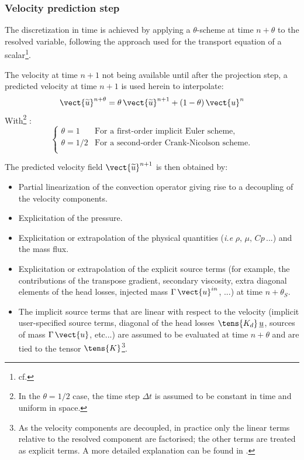 \subsubsection*{Velocity prediction step}
The discretization in time is achieved by applying a $\theta$-scheme
at time $n+\theta$ to the resolved variable, following the approach used
for the transport equation of a scalar\footnote{cf. }.

The velocity at time $n+1$ not being available until after the projection
step, a predicted velocity at time $n+1$ is used herein to interpolate:
\begin{equation}
\label{eq:navstv:theta_scheme}
\vect{\widetilde{u}}^{n+\theta} = \theta\, {\vect{\widetilde{u}}}^{n+1}+(1-\theta)\, \vect{u}^{n}
\end{equation}
With\footnote{In the $\theta = 1/2$ case, the time step $\Delta t$ is assumed
to be constant in time and uniform in space.} :
\begin{equation}
\left\{
\begin{array}{ll}
\theta = 1   & \text{For a first-order implicit Euler scheme,}\\
\theta = 1/2 & \text{For a second-order Crank-Nicolson scheme.}\\
\end{array}
\right.
\end{equation}

The predicted velocity field ${\vect{\widetilde{u}}^{n+1}}$ is then
obtained by:

\begin{itemize}
\item Partial linearization of the convection operator giving rise to a
decoupling of the velocity components.
\item Explicitation of the pressure.
\item Explicitation or extrapolation of the physical quantities (\emph{i.e}
$\rho,\,\mu,\,Cp\,...$) and the mass flux.
\item Explicitation or extrapolation of the explicit source terms
(for example, the contributions of the transpose gradient, secondary viscosity,
extra diagonal elements of the head losses, injected mass $\Gamma\,\vect{u}^{in}$, ...)
at time $n+\theta_{S}$.
\item The implicit source terms that are linear with respect to the velocity
(implicit user-specified source terms, diagonal of the head losses
$\tens{K_d}\,\underline{u}$, sources of mass $\Gamma\,\vect{u}$, etc...)
are assumed to be evaluated at time $n+\theta$ and are tied to the tensor
$\tens{K}$\footnote{As the velocity components are decoupled, in practice only
the linear terms relative to the resolved component are factorised; the other terms are treated as explicit terms. A more detailed explanation can be found in .}.
\end{itemize}

